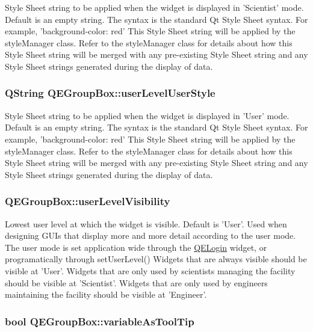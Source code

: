 Style Sheet string to be applied when the widget is displayed in 'Scientist' mode. Default is an empty string. The syntax is the standard Qt Style Sheet syntax. For example, 'background-\/color: red' This Style Sheet string will be applied by the styleManager class. Refer to the styleManager class for details about how this Style Sheet string will be merged with any pre-\/existing Style Sheet string and any Style Sheet strings generated during the display of data. \hypertarget{classQEGroupBox_a31519ee2f188352af49695b774c0794a}{
\subsubsection[{userLevelUserStyle}]{\setlength{\rightskip}{0pt plus 5cm}QString QEGroupBox::userLevelUserStyle}}
\label{classQEGroupBox_a31519ee2f188352af49695b774c0794a}
Style Sheet string to be applied when the widget is displayed in 'User' mode. Default is an empty string. The syntax is the standard Qt Style Sheet syntax. For example, 'background-\/color: red' This Style Sheet string will be applied by the styleManager class. Refer to the styleManager class for details about how this Style Sheet string will be merged with any pre-\/existing Style Sheet string and any Style Sheet strings generated during the display of data. \hypertarget{classQEGroupBox_af592de1c93b6a919b9431c0dc3868dcc}{
\subsubsection[{userLevelVisibility}]{ QEGroupBox::userLevelVisibility}}
\label{classQEGroupBox_af592de1c93b6a919b9431c0dc3868dcc}
Lowest user level at which the widget is visible. Default is 'User'. Used when designing GUIs that display more and more detail according to the user mode. The user mode is set application wide through the \hyperlink{classQELogin}{QELogin} widget, or programatically through setUserLevel() Widgets that are always visible should be visible at 'User'. Widgets that are only used by scientists managing the facility should be visible at 'Scientist'. Widgets that are only used by engineers maintaining the facility should be visible at 'Engineer'. \hypertarget{classQEGroupBox_a98b187722b014911112842e2bf315720}{
\subsubsection[{variableAsToolTip}]{\setlength{\rightskip}{0pt plus 5cm}bool QEGroupBox::variableAsToolTip}}
